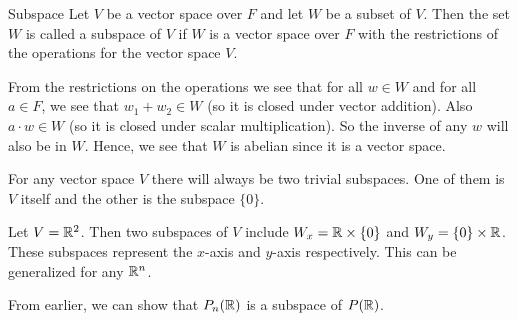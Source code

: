 \documentclass[main.tex]{subfiles}
\begin{document}
    \begin{defn}{Subspace}{}
        Let $V$ be a vector space over $F$ and let $W$ be a subset of $V$. Then the set $W$ is called a subspace of $V$ if $W$ is a vector space over $F$ with the restrictions of the operations for the vector space $V$. 
    \end{defn}
    From the restrictions on the operations we see that for all $w\in W$ and for all $a\in F$, we see that $w_1 + w_2 \in W$ (so it is closed under vector addition). Also $a\cdot w \in W$ (so it is closed under scalar multiplication). So the inverse of any $w$ will also be in $W$. Hence, we see that $W$ is abelian since it is a vector space. 

    \begin{example}{}{}
        For any vector space $V$ there will always be two trivial subspaces. One of them is $V$ itself and the other is the subspace $\{0\}$. 
    \end{example}

    \begin{example}{}{}
        Let $V = \mathbb{R}^2$. Then two subspaces of $V$ include $W_x = \mathbb{R} \times \{0\}$ and $W_y = \{0\} \times \mathbb{R}$. These subspaces represent the $x$-axis and $y$-axis respectively. This can be generalized for any $\mathbb{R}^n$.
    \end{example}

    \begin{example}{}{}
        From earlier, we can show that $P_n(\mathbb{R})$ is a subspace of $P(\mathbb{R})$. 
    \end{example}
\end{document}
